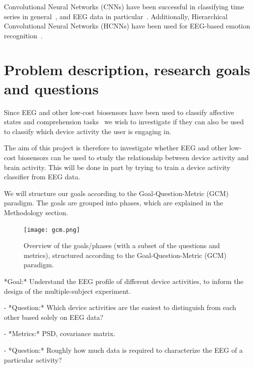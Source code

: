 \documentclass{IEEEtran}
\begin{document}
\begin{refsection}
Convolutional Neural Networks (CNNs) have been successful in classifying time series in general~\cite{zhao_convolutional_2017}, and EEG data in particular~\cite{schirrmeister_deep_2017}. Additionally, Hierarchical Convolutional Neural Networks (HCNNs) have been used for EEG-based emotion recognition~\cite{li_hierarchical_2018}.



\section{Problem description, research goals and questions}

Since EEG and other low-cost biosensors have been used to classify affective states and comprehension tasks~\cite{fucci_replication_2019} we wish to investigate if they can also be used to classify which device activity the user is engaging in.

The aim of this project is therefore to investigate whether EEG and other low-cost biosensors can be used to study the relationship between device activity and brain activity. This will be done in part by trying to train a device activity classifier from EEG data. %

We will structure our goals according to the Goal-Question-Metric (GCM) paradigm. The goals are grouped into phases, which are explained in the Methodology section.

\begin{figure}[h]
\centering
\texttt{[image: gcm.png]}
    \caption{Overview of the goals/phases (with a subset of the questions and metrics), structured according to the Goal-Question-Metric (GCM) paradigm.}\label{fig:gcm}
\end{figure}

\begin{markdown}
*Goal:* Understand the EEG profile of different device activities, to inform the design of the multiple-subject experiment.

 - *Question:* Which device activities are the easiest to distinguish from each other based solely on EEG data?

    - *Metrics:* PSD, covariance matrix.

 - *Question:* Roughly how much data is required to characterize the EEG of a particular activity?


\end{markdown}
\end{refsection}
\end{document}
